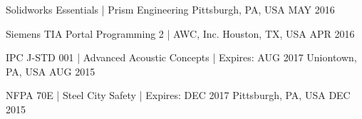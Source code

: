 
\begin{cvhonors}
	
	\cvhonor
	{Solidworks Essentials |} %
	{Prism Engineering} %
	{Pittsburgh, PA, USA} %
	{MAY 2016} %
	
	\cvhonor
	{Siemens TIA Portal Programming 2 |} %
	{AWC, Inc.} %
	{Houston, TX, USA} %
	{APR 2016} %
	
	\cvhonor
	{IPC J-STD 001 |} %
	{Advanced Acoustic Concepts | Expires: AUG 2017} %
	{Uniontown, PA, USA} %
	{AUG 2015} %
	
	\cvhonor
	{NFPA 70E |} %
	{Steel City Safety | Expires: DEC 2017} %
	{Pittsburgh, PA, USA} %
	{DEC 2015} %
	
\end{cvhonors}
